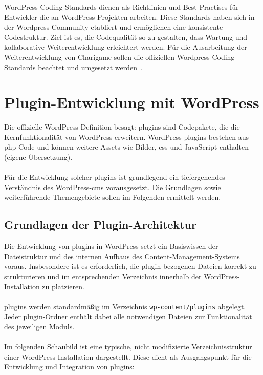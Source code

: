 WordPress Coding Standards dienen als Richtlinien und Best Practises für Entwickler die an WordPress Projekten arbeiten.
Diese Standards haben sich in der Wordpress Community etabliert und ermöglichen eine konsistente Codestruktur.
Ziel ist es, die Codequalität so zu gestalten, dass Wartung und kollaborative Weiterentwicklung erleichtert werden.
Für die Ausarbeitung der Weiterentwicklung von Charigame sollen die offiziellen Wordpress Coding Standards beachtet und umgesetzt werden~\cite{wordpress2024codingstandards}.


\section{Plugin-Entwicklung mit WordPress}

Die offizielle WordPress-Definition besagt: \glqq \gls{plugin}s sind Codepakete, die die Kernfunktionalität von WordPress erweitern.
WordPress-\gls{plugin}s bestehen aus \gls{php}-Code und können weitere Assets wie Bilder,
\gls{css} und JavaScript enthalten\grqq{} \cite{wordpress2024plugin} (eigene Übersetzung).
\\ \\
Für die Entwicklung solcher \gls{plugin}s ist grundlegend ein tiefergehendes Verständnis des WordPress-\gls{cms} vorausgesetzt.
Die Grundlagen sowie weiterführende Themengebiete sollen im Folgenden ermittelt werden.



\subsection{Grundlagen der Plugin-Architektur}

Die Entwicklung von \gls{plugin}s in WordPress setzt ein Basiswissen der Dateistruktur und des internen Aufbaus des Content-Management-Systems voraus.
Insbesondere ist es erforderlich, die \gls{plugin}-bezogenen Dateien korrekt zu strukturieren und im entsprechenden Verzeichnis innerhalb der WordPress-Installation zu platzieren.\\\\
\gls{plugin}s werden standardmäßig im Verzeichnis \texttt{wp-content/plugins} abgelegt.
Jeder \gls{plugin}-Ordner enthält dabei alle notwendigen Dateien zur Funktionalität des jeweiligen Moduls.\\\\
Im folgenden Schaubild ist eine typische, nicht modifizierte Verzeichnisstruktur einer WordPress-Installation dargestellt.
Diese dient als Ausgangspunkt für die Entwicklung und Integration von \gls{plugin}s:

